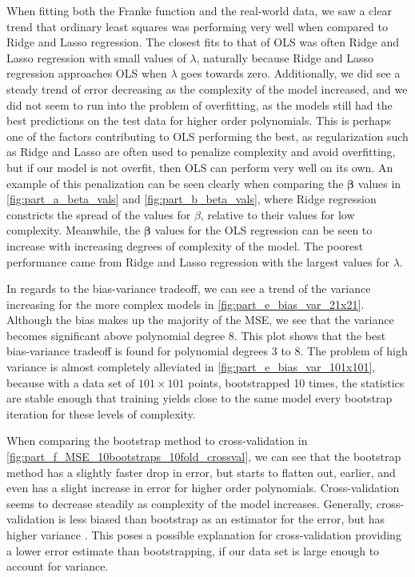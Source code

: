 \documentclass[12pt]{article}
\begin{document}
When fitting both the Franke function and the real-world data, we saw a clear trend that ordinary least squares was performing very well when compared to Ridge and Lasso regression. The closest fits to that of OLS was often Ridge and Lasso regression with small values of $\lambda$, naturally because Ridge and Lasso regression approaches OLS when $\lambda$ goes towards zero. Additionally, we did see a steady trend of error decreasing as the complexity of the model increased, and we did not seem to run into the problem of overfitting, as the models still had the best predictions on the test data for higher order polynomials. This is perhaps one of the factors contributing to OLS performing the best, as regularization such as Ridge and Lasso are often used to penalize complexity and avoid overfitting, but if our model is not overfit, then OLS can perform very well on its own. An example of this penalization can be seen clearly when comparing the $\boldsymbol{\beta}$ values in \autoref{fig:part_a_beta_vals} and \autoref{fig:part_b_beta_vals}, where Ridge regression constricts the spread of the values for $\beta$, relative to their values for low complexity. Meanwhile, the $\boldsymbol{\beta}$ values for the OLS regression can be seen to increase with increasing degrees of complexity of the model. The poorest performance came from Ridge and Lasso regression with the largest values for $\lambda$.

In regards to the bias-variance tradeoff, we can see a trend of the variance increasing for the more complex models in \autoref{fig:part_e_bias_var_21x21}. Although the bias makes up the majority of the MSE, we see that the variance becomes significant above polynomial degree 8. This plot shows that the best bias-variance tradeoff is found for polynomial degrees 3 to 8. The problem of high variance is almost completely alleviated in \autoref{fig:part_e_bias_var_101x101}, because with a data set of $101\times101$ points, bootstrapped 10 times, the statistics are stable enough that training yields close to the same model every bootstrap iteration for these levels of complexity.

When comparing the bootstrap method to cross-validation in \autoref{fig:part_f_MSE_10bootstraps_10fold_crossval}, we can see that the bootstrap method has a slightly faster drop in error, but starts to flatten out, earlier, and even has a slight increase in error for higher order polynomials. Cross-validation seems to decrease steadily as complexity of the model increases. Generally, cross-validation is less biased than bootstrap as an estimator for the error, but has higher variance \cite{CV-Boot}. This poses a possible explanation for cross-validation providing a lower error estimate than bootstrapping, if our data set is large enough to account for variance. 
\end{document}
